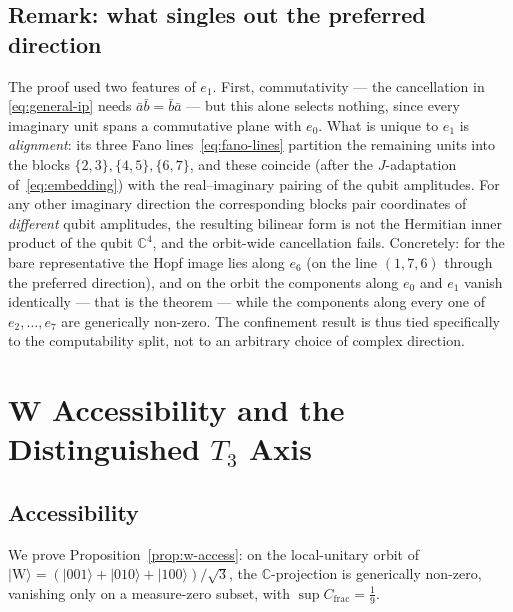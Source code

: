 \subsection{Remark: what singles out the preferred direction}

The proof used two features of $e_1$. First, commutativity --- the cancellation in
\eqref{eq:general-ip} needs $\bar a\bar b = \bar b\bar a$ --- but this alone selects nothing, since
every imaginary unit spans a commutative plane with $e_0$. What is unique to $e_1$ is
\emph{alignment}: its three Fano lines~\eqref{eq:fano-lines} partition the remaining units into the
blocks $\{2,3\},\{4,5\},\{6,7\}$, and these coincide (after the $J$-adaptation
of~\eqref{eq:embedding}) with the real--imaginary pairing of the qubit amplitudes. For any other
imaginary direction the corresponding blocks pair coordinates of \emph{different} qubit amplitudes,
the resulting bilinear form is not the Hermitian inner product of the qubit $\mathbb{C}^4$, and the
orbit-wide cancellation fails. Concretely: for the bare representative the Hopf image lies along
$e_6$ (on the line $(1,7,6)$ through the preferred direction), and on the orbit the components along
$e_0$ and $e_1$ vanish identically --- that is the theorem --- while the components along every one
of $e_2,\dots,e_7$ are generically non-zero. The confinement result is thus tied specifically to the
computability split, not to an arbitrary choice of complex direction.

\section{W Accessibility and the Distinguished \texorpdfstring{$T_3$}{T3} Axis}
\label{app:w-proof}

\subsection{Accessibility}

We prove Proposition~\ref{prop:w-access}: on the local-unitary orbit of
$\lvert\mathrm{W}\rangle = (\lvert001\rangle+\lvert010\rangle+\lvert100\rangle)/\sqrt3$, the
$\mathbb{C}$-projection is generically non-zero, vanishing only on a measure-zero subset, with
$\sup C_{\mathrm{frac}} = \tfrac19$.

